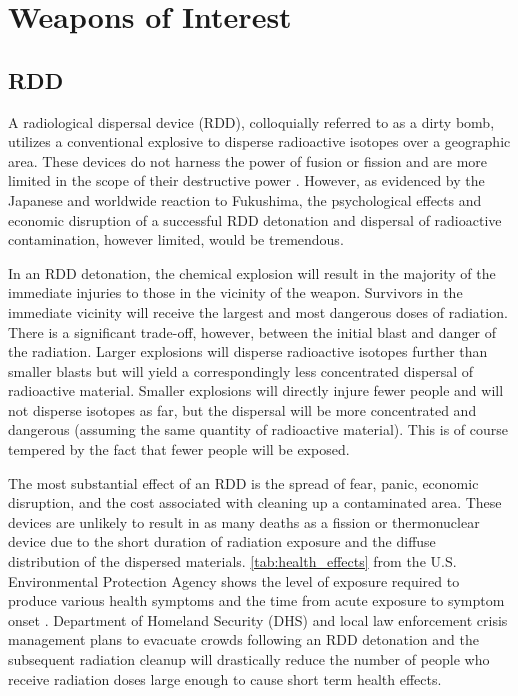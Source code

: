 \documentclass{report}
\begin{document}
\chapter[Appendix D: Weapons of Interest]{Weapons of Interest}  \label{app:weapons}



\section{RDD} \label{sec:RDD}

A radiological dispersal device (RDD), colloquially referred to as a dirty bomb, utilizes a conventional explosive to disperse radioactive isotopes over a geographic area. These devices do not harness the power of fusion or fission and are more limited in the scope of their destructive power \cite{Renewal2011}.  However, as evidenced by the Japanese and worldwide reaction to Fukushima, the psychological effects and economic disruption of a successful RDD detonation and dispersal of radioactive contamination, however limited, would be tremendous.
 
In an RDD detonation, the chemical explosion will result in the majority of the immediate injuries to those in the  vicinity of the weapon. Survivors in the immediate vicinity will receive the largest and most dangerous doses of radiation. There is a significant trade-off, however, between the initial blast and danger of the radiation. Larger explosions will disperse radioactive isotopes  further than smaller blasts but will yield a correspondingly less concentrated dispersal of radioactive material. Smaller explosions will directly injure fewer people and will not disperse isotopes as far,  but the dispersal will be more concentrated and dangerous (assuming the same quantity of radioactive material). This is of course tempered by the fact that fewer people will be exposed.

The most substantial effect of an RDD is the spread of fear, panic, economic disruption, and the cost associated with cleaning up a contaminated area. These devices are unlikely to result in as many deaths as a fission or thermonuclear device due to the short duration of radiation exposure and the diffuse distribution of the dispersed materials. \autoref{tab:health_effects} from the U.S. Environmental Protection Agency shows the level of exposure required to produce various health symptoms and the time from acute exposure to symptom onset \cite{USEPA1999}. Department of Homeland Security (DHS) and local law enforcement crisis management plans to evacuate crowds following an RDD detonation and the subsequent radiation cleanup will drastically reduce the number of people who receive radiation doses large enough to cause short term health effects.
\end{document}
